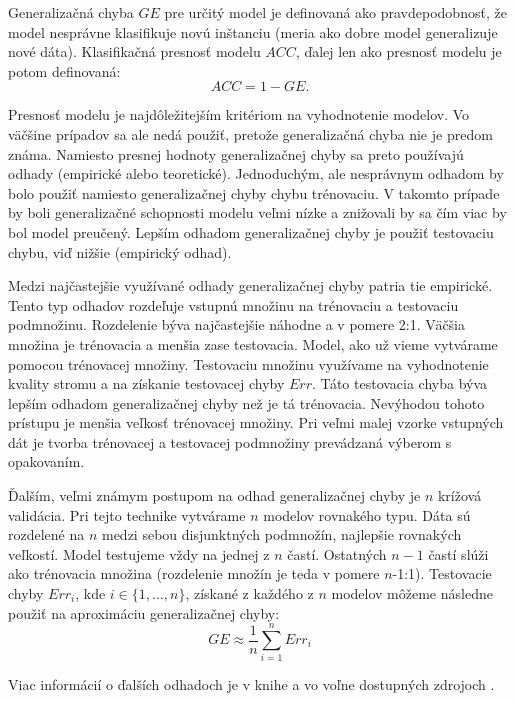 Generalizačná chyba $GE$ pre určitý model je definovaná ako pravdepodobnosť, že model nesprávne klasifikuje novú inštanciu (meria ako dobre model generalizuje nové dáta). Klasifikačná presnosť modelu $ACC$, ďalej len ako presnosť modelu je potom definovaná:
\begin{equation}
ACC = 1 - GE.
\end{equation}

Presnosť modelu je najdôležitejším kritériom na vyhodnotenie modelov. Vo väčšine prípadov sa ale nedá použiť, pretože generalizačná chyba nie je predom známa. Namiesto presnej hodnoty generalizačnej chyby sa preto používajú odhady (empirické alebo teoretické). Jednoduchým, ale nesprávnym odhadom by bolo použiť namiesto generalizačnej chyby chybu trénovaciu. V takomto prípade by boli generalizačné schopnosti modelu veľmi nízke a znižovali by sa čím viac by bol model preučený. Lepším odhadom generalizačnej chyby je použiť testovaciu chybu, viď nižšie (empirický odhad).

Medzi najčastejšie využívané odhady generalizačnej chyby patria tie empirické. Tento typ odhadov rozdeľuje vstupnú množinu na trénovaciu a testovaciu podmnožinu. Rozdelenie býva najčastejšie náhodne a v pomere 2:1. Väčšia množina je trénovacia a menšia zase testovacia. 
Model, ako už vieme vytvárame pomocou trénovacej množiny. Testovaciu množinu využívame na vyhodnotenie kvality stromu a na získanie testovacej chyby $Err$. Táto testovacia chyba býva lepším odhadom generalizačnej chyby než je tá trénovacia. Nevýhodou tohoto prístupu je menšia veľkosť trénovacej množiny. Pri veľmi malej vzorke vstupných dát je tvorba trénovacej a testovacej podmnožiny prevádzaná výberom s opakovaním.

Ďalším, veľmi známym postupom na odhad generalizačnej chyby je $n$ krížová validácia. Pri tejto technike vytvárame $n$ modelov rovnakého typu. Dáta sú rozdelené na $n$ medzi sebou disjunktných podmnožín, najlepšie rovnakých veľkostí. Model testujeme vždy na jednej z $n$ častí. Ostatných $n-1$ častí slúži ako trénovacia množina (rozdelenie množín je teda v pomere $n$-1:1). Testovacie chyby $Err_{i}$, kde $i \in \{1,\ldots,n\}$, získané z každého z $n$ modelov môžeme následne použiť na aproximáciu generalizačnej chyby:
\begin{equation}
GE \approx \dfrac{1}{n} \sum_{i=1}^{n} Err_{i}
\end{equation}

Viac informácií o ďalších odhadoch je v knihe \cite[s. 56]{kap1-DataMiningForTrees} a vo voľne dostupných zdrojoch \cite{wiki-CrossValidation,online-validation}.

